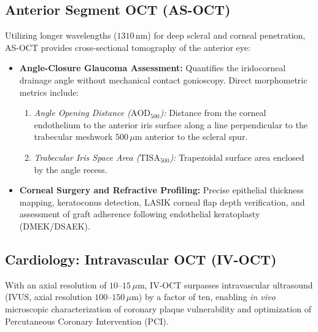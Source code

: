 \documentclass[11pt,a4paper]{article}
\begin{document}
\subsection{Anterior Segment OCT (AS-OCT)}

Utilizing longer wavelengths ($1310\,\text{nm}$) for deep scleral and corneal penetration, AS-OCT provides cross-sectional tomography of the anterior eye:
\begin{itemize}[leftmargin=*]
    \item \textbf{Angle-Closure Glaucoma Assessment:} Quantifies the iridocorneal drainage angle without mechanical contact gonioscopy. Direct morphometric metrics include:
    \begin{enumerate}
        \item \textit{Angle Opening Distance ($\text{AOD}_{500}$):} Distance from the corneal endothelium to the anterior iris surface along a line perpendicular to the trabecular meshwork $500\,\mu\text{m}$ anterior to the scleral spur.
        \item \textit{Trabecular Iris Space Area ($\text{TISA}_{500}$):} Trapezoidal surface area enclosed by the angle recess.
    \end{enumerate}
    \item \textbf{Corneal Surgery and Refractive Profiling:} Precise epithelial thickness mapping, keratoconus detection, LASIK corneal flap depth verification, and assessment of graft adherence following endothelial keratoplasty (DMEK/DSAEK).
\end{itemize}

\subsection{Cardiology: Intravascular OCT (IV-OCT)}

With an axial resolution of $10\text{--}15\,\mu\text{m}$, IV-OCT surpasses intravascular ultrasound (IVUS, axial resolution $100\text{--}150\,\mu\text{m}$) by a factor of ten, enabling \textit{in vivo} microscopic characterization of coronary plaque vulnerability and optimization of Percutaneous Coronary Intervention (PCI).
\end{document}
